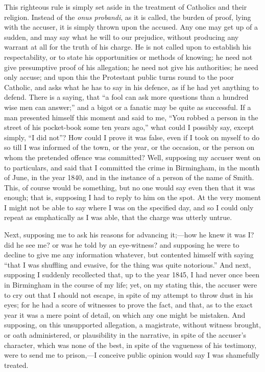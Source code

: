 This righteous rule is simply set aside in the
treatment of Catholics and their religion. Instead of the
\emph{onus probandi}, as it is called, the burden of
proof, lying with the accuser, it is simply thrown upon
the accused. Any one may get up of a sudden, and may say
what he will to our prejudice, without producing any
warrant at all for the truth of his charge. He is not
called upon to establish his respectability, or to state
his opportunities or methods of knowing; he need not give
presumptive proof of his allegation; he need not give his
authorities; he need only accuse; and upon this the
Protestant public turns round to the poor Catholic, and
asks what he has to say in his defence, as if he had yet
anything to defend. There is a saying, that ``a fool
can ask more questions than a hundred wise men can
answer;'' and a bigot or a fanatic may be quite as
successful. If a man presented himself this moment and
said to me, ``You robbed a person in the street of
his pocket-book some ten years ago,'' what could I
possibly say, except simply, ``I did not''? How
could I prove it was false, even if I took on myself to
do so till I was informed of the town, or the year, or
the occasion, or the person on whom the pretended offence
was committed? Well, supposing my accuser went on to
particulars, and said that I committed the crime in
Birmingham, in the month of June, in the year 1840, and
in the instance of a person of the name of Smith. This,
of course would be something, but no one would say even
then that it was enough; that is, supposing I had to
reply to him on the spot. At the very moment I might not
be able to say where I was on the specified day, and so I
could only repeat as emphatically as I was able, that the
charge was utterly untrue.

Next, supposing me to ask his reasons for advancing
it;—how he knew it was I? did he see me? or was he
told by an eye-witness? and supposing he were to decline
to give me any information whatever, but contented
himself with saying ``that I was shuffling and
evasive, for the thing was quite notorious.'' And
next, supposing I suddenly recollected that, up to the
year 1845, I had never once been in Birmingham in the
course of my life; yet, on my stating this, the accuser
were to cry out that I should not escape, in spite of my
attempt to throw dust in his eyes; for he had a score of
witnesses to prove the fact, and that, as to the exact
year it was a mere point of detail, on which any one
might be mistaken. And supposing, on this unsupported
allegation, a magistrate, without witness brought, or
oath administered, or plausibility in the narrative, in
spite of the accuser's character, which was none of the
best, in spite of the vagueness of his testimony, were to
send me to prison,—I conceive public opinion would
say I was shamefully treated.

